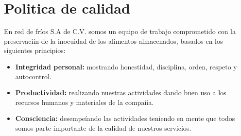 \renewcommand{\Codigo}{BPD-POL-1}
\renewcommand{\FechaPub}{2023-01}
\renewcommand{\Edit}{02}
\renewcommand{\Titulo}{Politica de calidad}

\section{\Titulo}

En red de fríos S.A de C.V. somos un equipo de trabajo comprometido con la preservaciín de la inocuidad de los alimentos almacenados, basados en los siguientes principios:

\begin{itemize}
	\item \textbf{Integridad personal:} mostrando honestidad, disciplina, orden, respeto y autocontrol.
	\item \textbf{Productividad:} realizando nuestras actividades dando buen uso a los recursos humanos y materiales de la compaíía.
	\item \textbf{Consciencia:} desempeíando las actividades teniendo en mente que todos somos parte importante de la calidad de nuestros servicios.
\end{itemize}